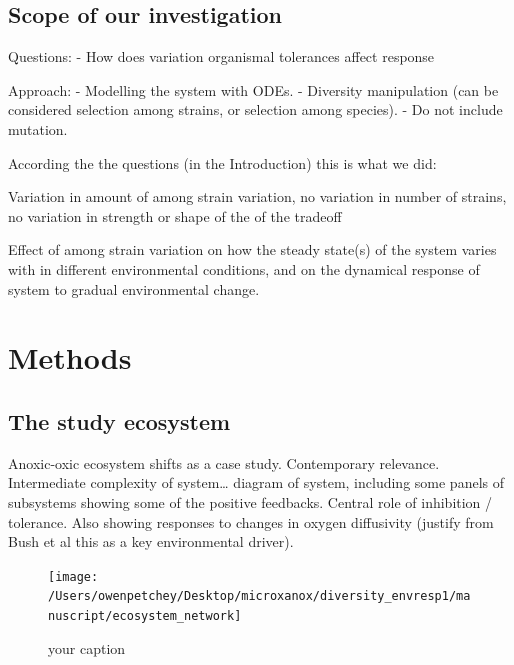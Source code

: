 \documentclass{article}
\begin{document}
\hypertarget{scope-of-our-investigation}{%
\subsection{Scope of our
investigation}\label{scope-of-our-investigation}}

Questions: - How does variation organismal tolerances affect response

Approach: - Modelling the system with ODEs. - Diversity manipulation
(can be considered selection among strains, or selection among species).
- Do not include mutation.

According the the questions (in the Introduction) this is what we did:

Variation in amount of among strain variation, no variation in number of
strains, no variation in strength or shape of the of the tradeoff

Effect of among strain variation on how the steady state(s) of the
system varies with in different environmental conditions, and on the
dynamical response of system to gradual environmental change.

\hypertarget{methods}{%
\section{Methods}\label{methods}}

\hypertarget{the-study-ecosystem}{%
\subsection{The study ecosystem}\label{the-study-ecosystem}}

Anoxic-oxic ecosystem shifts as a case study. Contemporary relevance.
Intermediate complexity of system\ldots{} diagram of system, including
some panels of subsystems showing some of the positive feedbacks.
Central role of inhibition / tolerance. Also showing responses to
changes in oxygen diffusivity (justify from Bush et al this as a key
environmental driver).

\begin{figure}

{\centering \texttt{[image: /Users/owenpetchey/Desktop/microxanox/diversity\_envresp1/manuscript/ecosystem\_network]} 

}

\caption{your caption}\label{fig:ecosys_network}
\end{figure}
\end{document}
